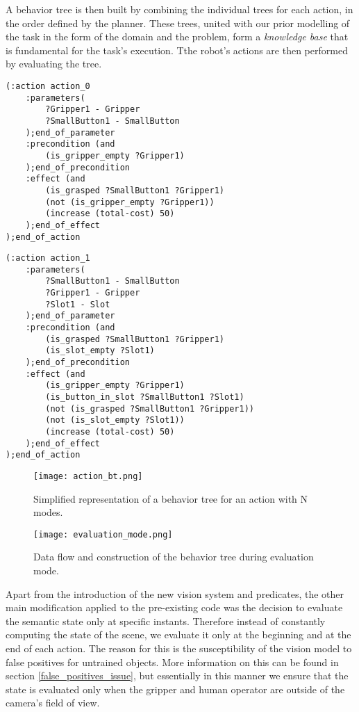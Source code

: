 A behavior tree is then built by combining the individual trees for each action, in the order defined by the planner. These trees, united with our prior modelling of the task in the form of the domain and the problem, form a \emph{knowledge base} that is fundamental for the task's execution. Tthe robot's actions are then performed by evaluating the tree.

\begin{minipage}[t]{0.5\textwidth}
    \begin{lstlisting}[language=PDDL]
(:action action_0
    :parameters(
        ?Gripper1 - Gripper
        ?SmallButton1 - SmallButton
    );end_of_parameter
    :precondition (and
        (is_gripper_empty ?Gripper1)
    );end_of_precondition
    :effect (and
        (is_grasped ?SmallButton1 ?Gripper1)
        (not (is_gripper_empty ?Gripper1))
        (increase (total-cost) 50)
    );end_of_effect
);end_of_action
    \end{lstlisting}
\end{minipage}
\hfill
\begin{minipage}[t]{0.5\textwidth}
    \begin{lstlisting}[language=PDDL]
(:action action_1
    :parameters(
        ?SmallButton1 - SmallButton
        ?Gripper1 - Gripper
        ?Slot1 - Slot
    );end_of_parameter
    :precondition (and
        (is_grasped ?SmallButton1 ?Gripper1)
        (is_slot_empty ?Slot1)
    );end_of_precondition
    :effect (and
        (is_gripper_empty ?Gripper1)
        (is_button_in_slot ?SmallButton1 ?Slot1)
        (not (is_grasped ?SmallButton1 ?Gripper1))
        (not (is_slot_empty ?Slot1))
        (increase (total-cost) 50)
    );end_of_effect
);end_of_action 
    \end{lstlisting}
\end{minipage}

\begin{wrapfigure}{r}{0.4\textwidth}
    \centering
    \texttt{[image: action\_bt.png]}
    \caption{Simplified representation of a behavior tree for an action with N modes.}
\end{wrapfigure}

\begin{figure}[ht]
    \texttt{[image: evaluation\_mode.png]}
    \caption{Data flow and construction of the behavior tree during evaluation mode.}    
\end{figure}

Apart from the introduction of the new vision system and predicates, the other main modification applied to the pre-existing code was the decision to evaluate the semantic state only at specific instants. Therefore instead of constantly computing the state of the scene, we evaluate it only at the beginning and at the end of each action. The reason for this is the susceptibility of the vision model to false positives for untrained objects. More information on this can be found in section \ref{false_positives_issue}, but essentially in this manner we ensure that the state is evaluated only when the gripper and human operator are outside of the camera's field of view.

